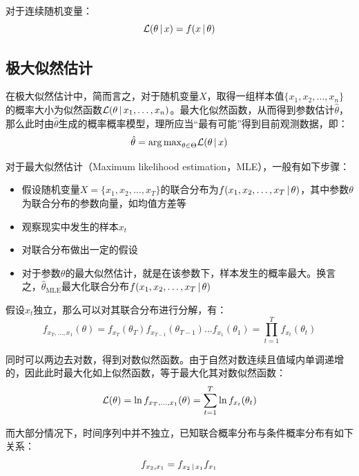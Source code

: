 \documentclass[11pt]{article}
\begin{document}
对于连续随机变量：
\begin{equation*}
    \mathcal{L}(\theta\,\vert\, x) = f(x\,\vert\, \theta)
\end{equation*}

\subsection{极大似然估计}

在极大似然估计中，简而言之，对于随机变量$X$，取得一组样本值$\{x_1,x_2,\dots,x_n\}$的概率大小为似然函数$\mathcal{L}(\theta \,\vert\, x_1,\dots,x_n)$。最大化似然函数，从而得到参数估计$\hat{\theta}$，那么此时由$\hat{\theta}$生成的概率概率模型，理所应当“最有可能”得到目前观测数据，即：
\begin{equation*}
    \hat{\theta} = {\arg \max}_{\theta \in \Theta} \mathcal{L}(\theta \,\vert\, x)
\end{equation*}

对于最大似然估计（Maximum likelihood estimation，MLE），一般有如下步骤：
\begin{itemize}
    \item 假设随机变量$X=\{x_1,x_2,\dots,x_T\}$的联合分布为$f(x_1,x_2,\dots,x_T \,\vert\, \theta)$，其中参数$\theta$为联合分布的参数向量，如均值方差等
    \item 观察现实中发生的样本$x_t$
    \item 对联合分布做出一定的假设
    \item 对于参数$\theta$的最大似然估计，就是在该参数下，样本发生的概率最大。换言之，$\hat{\theta}_{\text{MLE}}$最大化联合分布$f(x_1,x_2,\dots,x_T \,\vert\, \theta)$
\end{itemize}

假设$x_t$独立，那么可以对其联合分布进行分解，有：
\begin{equation*}
    f_{x_T,\dots,x_1}(\theta)
    = f_{x_T}(\theta_T) f_{x_{T-1}}(\theta_{T-1})\dots f_{x_1}(\theta_1)
    = \prod_{t=1}^{T} f_{x_t}(\theta_t)
\end{equation*}

同时可以两边去对数，得到对数似然函数。由于自然对数连续且值域内单调递增的，因此此时最大化如上似然函数，等于最大化其对数似然函数：
\begin{equation*}
    \mathcal{L}(\theta) = \ln f_{x_T,\dots,x_1}(\theta)
    = \sum_{t=1}^{T} \ln f_{x_t}(\theta_t)
\end{equation*}

而大部分情况下，时间序列中并不独立，已知联合概率分布与条件概率分布有如下关系：
\begin{equation*}
    f_{x_2,x_1} = f_{x_2 \,\vert\, x_1} f_{x_1}
\end{equation*}
\end{document}
